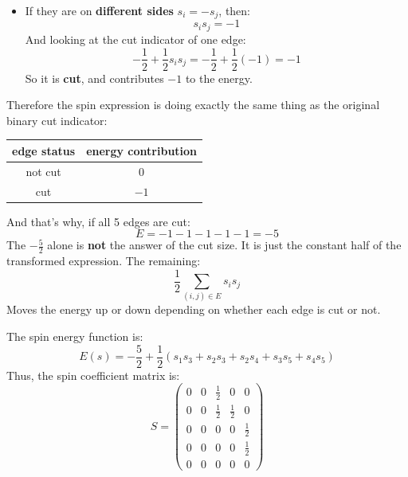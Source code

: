 \begin{deepeningbox}
\begin{itemize}
        \item If they are on \textbf{different sides} $s_i = -s_j$, then:
            \begin{equation*}
                s_i s_j = -1
            \end{equation*}
            And looking at the cut indicator of one edge:
            \begin{equation*}
                -\frac{1}{2} + \frac{1}{2}s_is_j = -\frac{1}{2} + \frac{1}{2}(-1) = -1
            \end{equation*}
            So it is \textbf{cut}, and contributes $-1$ to the energy.
    \end{itemize}
    Therefore the spin expression is doing exactly the same thing as the original binary cut indicator:
    \begin{center}
        \begin{tabular}{@{} c | c @{}}
            \toprule
            edge status & energy contribution \\
            \midrule
            not cut & $0$ \\
            cut & $-1$ \\
            \bottomrule
        \end{tabular}
    \end{center}
    And that's why, if all 5 edges are cut:
    \begin{equation*}
        E = -1 -1 -1 -1 -1 = -5
    \end{equation*}
    The $-\frac{5}{2}$ alone is \textbf{not} the answer of the cut size. It is just the constant half of the transformed expression. The remaining:
    \begin{equation*}
        \frac{1}{2}\sum_{(i,j)\in E} s_is_j
    \end{equation*}
    Moves the energy up or down depending on whether each edge is cut or not.
\end{deepeningbox}

\highspace
{} The spin energy function is:
\begin{equation*}
    E(s) = -\frac{5}{2} + \frac{1}{2}\left(s_1s_3 + s_2s_3 + s_2s_4 + s_3s_5 + s_4s_5\right)
\end{equation*}
Thus, the spin coefficient matrix is:
\begin{equation*}
    \boxed{S =
        \begin{pmatrix}
            0 & 0 & \frac{1}{2} & 0 & 0 \\[.3em]
            0 & 0 & \frac{1}{2} & \frac{1}{2} & 0 \\[.3em]
            0 & 0 & 0 & 0 & \frac{1}{2} \\[.3em]
            0 & 0 & 0 & 0 & \frac{1}{2} \\[.3em]
            0 & 0 & 0 & 0 & 0
    \end{pmatrix}}
\end{equation*}

